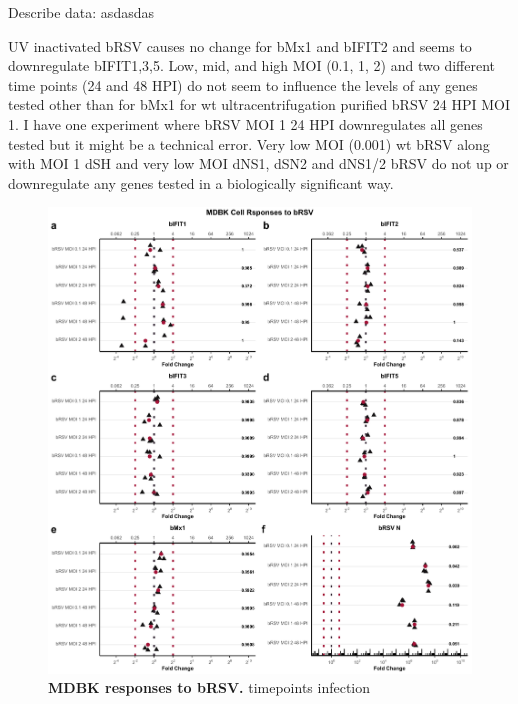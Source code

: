 Describe data: \newline
asdasdas

UV inactivated bRSV causes no change for bMx1 and bIFIT2 and seems to downregulate bIFIT1,3,5. Low, mid, and high MOI (0.1, 1, 2) and two different time points (24 and 48 HPI) do not seem to influence the levels of any genes tested other than for bMx1 for wt ultracentrifugation purified bRSV 24 HPI MOI 1. I have one experiment where bRSV MOI 1 24 HPI downregulates all genes tested but it might be a technical error. 
Very low MOI (0.001) wt bRSV along with MOI 1 dSH and very low MOI dNS1, dSN2 and dNS1/2 bRSV do not up or downregulate any genes tested in a biologically significant way.

\begin{figure}
    \centering
    \includegraphics[width=1\linewidth]{07. Chapter 2/Figs/02. Induction/03. mdbk_brsv_timepoints.pdf}
    \caption[MDBK responses to bRSV.]{\textbf{MDBK responses to bRSV.} timepoints infection }
    \label{MDBK responses to bRSV}
\end{figure}

